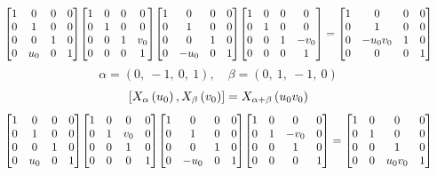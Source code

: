 \documentclass[11pt]{article}
\theoremstyle{definition}
\begin{document}
\[
\scaletoalign{\textwidth}{{\left[\begin{matrix}1 & 0 & 0 & 0\\0 & 1 & 0 & 0\\0 & 0 & 1 & 0\\0 & u_{0} & 0 & 1\end{matrix}\right]} {\left[\begin{matrix}1 & 0 & 0 & 0\\0 & 1 & 0 & 0\\0 & 0 & 1 & v_{0}\\0 & 0 & 0 & 1\end{matrix}\right]} {\left[\begin{matrix}1 & 0 & 0 & 0\\0 & 1 & 0 & 0\\0 & 0 & 1 & 0\\0 & - u_{0} & 0 & 1\end{matrix}\right]} {\left[\begin{matrix}1 & 0 & 0 & 0\\0 & 1 & 0 & 0\\0 & 0 & 1 & - v_{0}\\0 & 0 & 0 & 1\end{matrix}\right]} = {\left[\begin{matrix}1 & 0 & 0 & 0\\0 & 1 & 0 & 0\\0 & - u_{0} v_{0} & 1 & 0\\0 & 0 & 0 & 1\end{matrix}\right]}}
\]
\[
\alpha = \left( 0, \  -1, \  0, \  1\right), \quad \beta = \left( 0, \  1, \  -1, \  0\right)
\]
\[
\scaletoalign{\textwidth}{\left[ X_{\alpha}\left(u_{0}\right), X_{\beta}\left(v_{0}\right) \right] = X_{\alpha + \beta}\left(u_{0} v_{0}\right)}
\]
\[
\scaletoalign{\textwidth}{{\left[\begin{matrix}1 & 0 & 0 & 0\\0 & 1 & 0 & 0\\0 & 0 & 1 & 0\\0 & u_{0} & 0 & 1\end{matrix}\right]} {\left[\begin{matrix}1 & 0 & 0 & 0\\0 & 1 & v_{0} & 0\\0 & 0 & 1 & 0\\0 & 0 & 0 & 1\end{matrix}\right]} {\left[\begin{matrix}1 & 0 & 0 & 0\\0 & 1 & 0 & 0\\0 & 0 & 1 & 0\\0 & - u_{0} & 0 & 1\end{matrix}\right]} {\left[\begin{matrix}1 & 0 & 0 & 0\\0 & 1 & - v_{0} & 0\\0 & 0 & 1 & 0\\0 & 0 & 0 & 1\end{matrix}\right]} = {\left[\begin{matrix}1 & 0 & 0 & 0\\0 & 1 & 0 & 0\\0 & 0 & 1 & 0\\0 & 0 & u_{0} v_{0} & 1\end{matrix}\right]}}
\]
\end{document}
